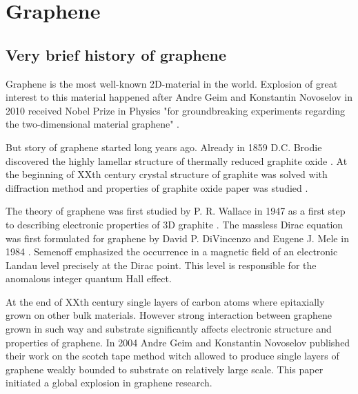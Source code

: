 \chapter{Graphene}
\section{Very brief history of graphene}
Graphene is the most well-known 2D-material in the world.  Explosion of great interest to this material happened after Andre Geim and Konstantin Novoselov in 2010 received Nobel Prize in Physics "for groundbreaking experiments regarding the two-dimensional material graphene" \cite{geim}. 

But story of graphene started long years ago. Already in 1859 D.C. Brodie discovered the highly lamellar structure of thermally reduced graphite oxide \cite{brodie}. At the beginning of XXth century crystal structure of graphite was solved with diffraction method \cite{debije, bernal} and properties of graphite oxide paper was studied \cite{haenni}.

The theory of graphene was first studied by P. R. Wallace in 1947 as a first step to describing electronic properties of 3D graphite \cite{wallace}. The massless Dirac equation was first formulated for graphene by David P. DiVincenzo and Eugene J. Mele in 1984 \cite{divincenzo}. Semenoff emphasized the occurrence in a magnetic field of an electronic Landau level precisely at the Dirac point. This level is responsible for the anomalous integer quantum Hall effect.

At the end of XXth century single layers of carbon atoms where epitaxially grown on other bulk materials\cite{epitaxial}. However strong interaction between graphene grown in such way and substrate significantly affects electronic structure and properties of graphene. In 2004 Andre Geim and Konstantin Novoselov published their work on the scotch tape method witch allowed to produce single layers of graphene weakly bounded to substrate on relatively large scale\cite{geim-science}. This paper initiated a global explosion in graphene research.

